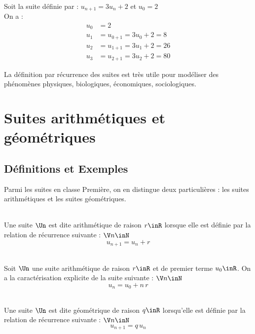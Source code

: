 \documentclass[12pt,fleqn]{report} %
\begin{document}
\begin{example}\label{Exemple Calcul terme suite par récurrence}\text{ }\\
	Soit la  suite définie par : $u_{n+1} = 3 u_n + 2$  et $u_0 = 2$\\
	On a : \begin{align*}
	u_0 & = 2 \\
	u_1 & = u_{0+1} = 3 u_0 + 2 = 8 \\
	u_2 & = u_{1+1} = 3 u_1 + 2 = 26 \\
	u_3 & = u_{2 + 1} = 3 u_2 + 2 = 80
	\end{align*}
\end{example}
\begin{remark}
	La définition par récurrence des suites est très utile pour modéliser des phénomènes physiques, biologiques, économiques, sociologiques.
\end{remark}

\section{Suites arithmétiques et géométriques}

\subsection{Définitions et Exemples}
Parmi les suites en classe Première, on en distingue deux particulières : les suites arithmétiques et les suites géométriques.

\begin{definition}\text{ }\\
	Une suite $\Un$ est dite arithmétique de raison $r \inR$ lorsque elle est définie par la relation de récurrence suivante : $\V n \inN$
	\[
	u_{n+1} = u_n + r
	\]
\end{definition}

\begin{proposition}\text{ }\\
	Soit $\Un$ une suite arithmétique de raison $r \inR$ et de premier terme $u_0 \inR$. On a la caractérisation explicite de la suite suivante : $\V n \inN$
	\[
	u_n = u_0 + n\,r
	\]
\end{proposition}


\begin{definition}\text{ }\\
	Une suite $\Un$ est dite géométrique de raison $q \inR$ lorsqu'elle est définie par la relation de récurrence suivante : $\V n \inN$
	\[
	u_{n+1} = q \,u_n
	\]
\end{definition}
\end{document}
